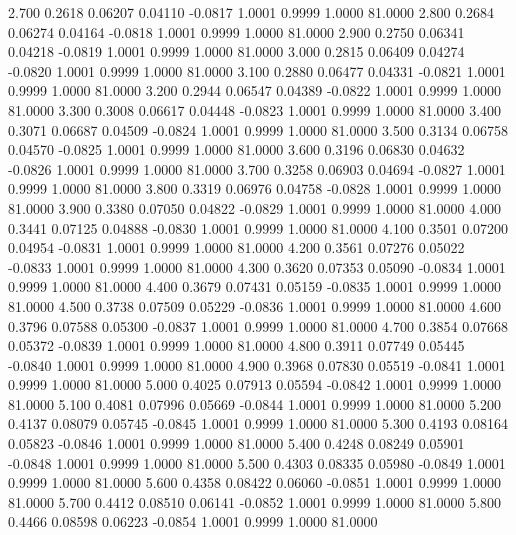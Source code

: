    2.700   0.2618   0.06207   0.04110  -0.0817   1.0001   0.9999   1.0000  81.0000
   2.800   0.2684   0.06274   0.04164  -0.0818   1.0001   0.9999   1.0000  81.0000
   2.900   0.2750   0.06341   0.04218  -0.0819   1.0001   0.9999   1.0000  81.0000
   3.000   0.2815   0.06409   0.04274  -0.0820   1.0001   0.9999   1.0000  81.0000
   3.100   0.2880   0.06477   0.04331  -0.0821   1.0001   0.9999   1.0000  81.0000
   3.200   0.2944   0.06547   0.04389  -0.0822   1.0001   0.9999   1.0000  81.0000
   3.300   0.3008   0.06617   0.04448  -0.0823   1.0001   0.9999   1.0000  81.0000
   3.400   0.3071   0.06687   0.04509  -0.0824   1.0001   0.9999   1.0000  81.0000
   3.500   0.3134   0.06758   0.04570  -0.0825   1.0001   0.9999   1.0000  81.0000
   3.600   0.3196   0.06830   0.04632  -0.0826   1.0001   0.9999   1.0000  81.0000
   3.700   0.3258   0.06903   0.04694  -0.0827   1.0001   0.9999   1.0000  81.0000
   3.800   0.3319   0.06976   0.04758  -0.0828   1.0001   0.9999   1.0000  81.0000
   3.900   0.3380   0.07050   0.04822  -0.0829   1.0001   0.9999   1.0000  81.0000
   4.000   0.3441   0.07125   0.04888  -0.0830   1.0001   0.9999   1.0000  81.0000
   4.100   0.3501   0.07200   0.04954  -0.0831   1.0001   0.9999   1.0000  81.0000
   4.200   0.3561   0.07276   0.05022  -0.0833   1.0001   0.9999   1.0000  81.0000
   4.300   0.3620   0.07353   0.05090  -0.0834   1.0001   0.9999   1.0000  81.0000
   4.400   0.3679   0.07431   0.05159  -0.0835   1.0001   0.9999   1.0000  81.0000
   4.500   0.3738   0.07509   0.05229  -0.0836   1.0001   0.9999   1.0000  81.0000
   4.600   0.3796   0.07588   0.05300  -0.0837   1.0001   0.9999   1.0000  81.0000
   4.700   0.3854   0.07668   0.05372  -0.0839   1.0001   0.9999   1.0000  81.0000
   4.800   0.3911   0.07749   0.05445  -0.0840   1.0001   0.9999   1.0000  81.0000
   4.900   0.3968   0.07830   0.05519  -0.0841   1.0001   0.9999   1.0000  81.0000
   5.000   0.4025   0.07913   0.05594  -0.0842   1.0001   0.9999   1.0000  81.0000
   5.100   0.4081   0.07996   0.05669  -0.0844   1.0001   0.9999   1.0000  81.0000
   5.200   0.4137   0.08079   0.05745  -0.0845   1.0001   0.9999   1.0000  81.0000
   5.300   0.4193   0.08164   0.05823  -0.0846   1.0001   0.9999   1.0000  81.0000
   5.400   0.4248   0.08249   0.05901  -0.0848   1.0001   0.9999   1.0000  81.0000
   5.500   0.4303   0.08335   0.05980  -0.0849   1.0001   0.9999   1.0000  81.0000
   5.600   0.4358   0.08422   0.06060  -0.0851   1.0001   0.9999   1.0000  81.0000
   5.700   0.4412   0.08510   0.06141  -0.0852   1.0001   0.9999   1.0000  81.0000
   5.800   0.4466   0.08598   0.06223  -0.0854   1.0001   0.9999   1.0000  81.0000
